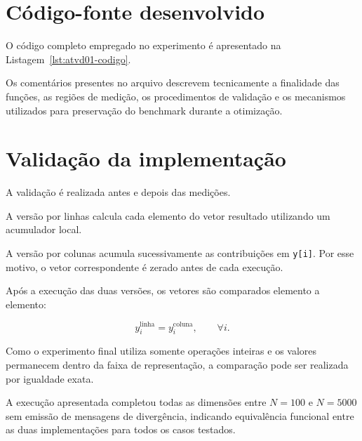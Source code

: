 
\section{Código-fonte desenvolvido}

\label{sec:atvd01-codigo}

O código completo empregado no experimento é apresentado na
Listagem~\ref{lst:atvd01-codigo}.

Os comentários presentes no arquivo descrevem tecnicamente a finalidade
das funções, as regiões de medição, os procedimentos de validação e os
mecanismos utilizados para preservação do benchmark durante a otimização.





\section{Validação da implementação}

\label{sec:atvd01-validacao}

A validação é realizada antes e depois das medições.

A versão por linhas calcula cada elemento do vetor resultado utilizando
um acumulador local.

A versão por colunas acumula sucessivamente as contribuições em
\texttt{y[i]}. Por esse motivo, o vetor correspondente é zerado antes de
cada execução.

Após a execução das duas versões, os vetores são comparados elemento a
elemento:

\begin{equation}
    y_i^{\mathrm{linha}}
    =
    y_i^{\mathrm{coluna}},
    \qquad
    \forall i.
\end{equation}

Como o experimento final utiliza somente operações inteiras e os valores
permanecem dentro da faixa de representação, a comparação pode ser
realizada por igualdade exata.

A execução apresentada completou todas as dimensões entre \(N=100\) e
\(N=5000\) sem emissão de mensagens de divergência, indicando equivalência
funcional entre as duas implementações para todos os casos testados.

